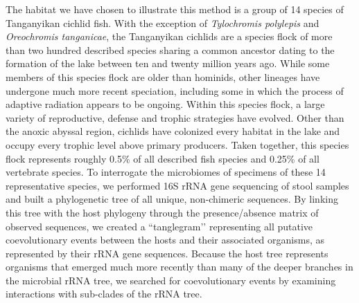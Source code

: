 The habitat we have chosen to illustrate this method is a group of 14 species of Tanganyikan cichlid fish. With the exception of {\em Tylochromis polylepis} and {\em Oreochromis tanganicae}, the Tanganyikan cichlids are a species flock of more than two hundred described species sharing a common ancestor dating to the formation of the lake between ten and twenty million years ago. While some members of this species flock are older than hominids, other lineages have undergone much more recent speciation, including some in which the process of adaptive radiation appears to be ongoing. Within this species flock, a large variety of reproductive, defense and trophic strategies have evolved. Other than the anoxic abyssal region, cichlids have colonized every habitat in the lake and occupy every trophic level above primary producers. Taken together, this species flock represents roughly 0.5\% of all described fish species and 0.25\% of all vertebrate species. To interrogate the microbiomes of specimens of these 14 representative species, we performed 16S rRNA gene sequencing of stool samples and built a phylogenetic tree of all unique, non-chimeric sequences. By linking this tree with the host phylogeny through the presence/absence matrix of observed sequences, we created a ``tanglegram’’ representing all putative coevolutionary events between the hosts and their associated organisms, as represented by their rRNA gene sequences. Because the host tree represents organisms that emerged much more recently than many of the deeper branches in the microbial rRNA tree, we searched for coevolutionary events by examining interactions with sub-clades of the rRNA tree.